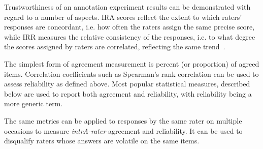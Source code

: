 Trustworthiness of an annotation experiment results can be demonstrated with regard to a number of aspects. 
\gls{IRA} scores reflect the extent to which raters' responses are concordant, i.e. how often the raters assign the same precise score, while \gls{IRR} measures the relative consistency of the responses, i.e. to what degree the scores assigned by raters are correlated, reflecting the same trend~\cite{Gisev2013}.

The simplest form of agreement measurement is percent (or proportion) of agreed items. Correlation coefficients such as Spearman's rank correlation can be used to assess reliability as defined above.
Most popular statistical measures, described below are used to report both agreement and reliability, with reliability being a more generic term.

The same metrics can be applied to responses by the same rater on multiple occasions to measure \textit{intrA-rater} agreement and reliability. It can be used to disqualify raters whose answers are volatile on the same items.



